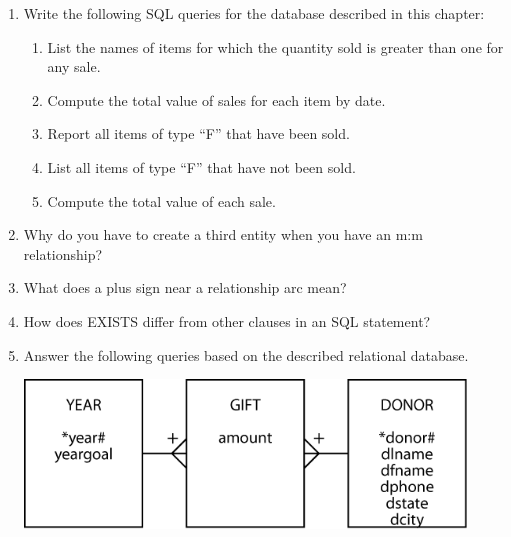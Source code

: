 \documentclass[
]{article}
\begin{document}
\begin{enumerate}
\def\labelenumi{\arabic{enumi}.}
\setcounter{enumi}{2}
\item
  Write the following SQL queries for the database described in this chapter:

  \begin{enumerate}
  \def\labelenumii{\alph{enumii}.}
  \item
    List the names of items for which the quantity sold is greater than one for any sale.
  \item
    Compute the total value of sales for each item by date.
  \item
    Report all items of type ``F'' that have been sold.
  \item
    List all items of type ``F'' that have not been sold.
  \item
    Compute the total value of each sale.
  \end{enumerate}
\item
  Why do you have to create a third entity when you have an m:m relationship?
\item
  What does a plus sign near a relationship arc mean?
\item
  How does EXISTS differ from other clauses in an SQL statement?
\item
  Answer the following queries based on the described relational database.

  \includegraphics[width=4.61458in,height=\textheight]{Figures/Chapter 5/gift.png}


\end{enumerate}
\end{document}
